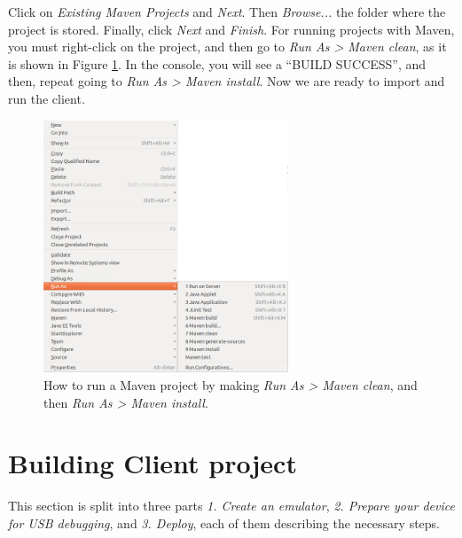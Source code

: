 Click on \textit{Existing Maven Projects} and \textit{Next}. Then \textit{Browse...} the folder where the project is stored. Finally, click \textit{Next} and \textit{Finish}. For running projects with Maven, you must right-click on the project, and then go to \textit{Run As > Maven clean}, as it is shown in Figure \ref{fig:RunAs}. In the console, you will see a ``BUILD SUCCESS'', and then, repeat going to \textit{Run As > Maven install}. Now we are ready to import and run the client.

\begin{figure}
  \begin{center}
    \includegraphics[width=0.65\textwidth]{./Figures/runAs.png}
    \caption{How to run a Maven project by making \textit{Run As > Maven clean}, and then \textit{Run As > Maven install}.}
    \label{fig:RunAs}
  \end{center}
\end{figure}

\section{Building Client project}
\label{sec:buildclient}
This section is split into three parts \textit{1. Create an emulator}, \textit{2. Prepare your device for USB debugging}, and \textit{3. Deploy}, each of them describing the necessary steps.

